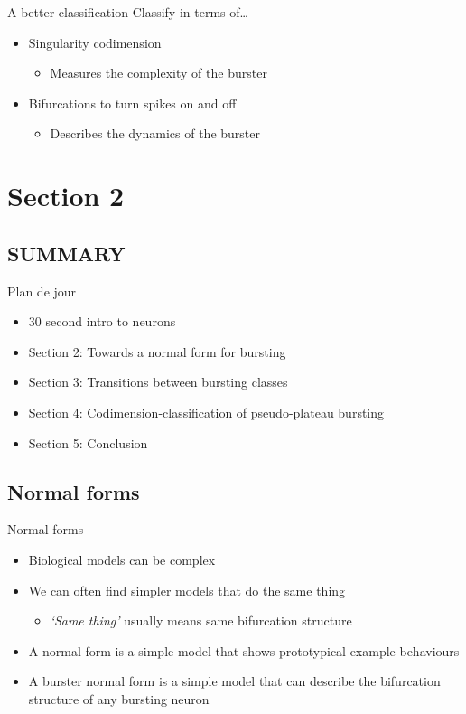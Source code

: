 \documentclass[presentation]{beamer}
\begin{document}
\begin{frame}[label={sec:org04835f9}]{A better classification}
Classify in terms of\ldots{}
\vfill
\begin{itemize}
\item Singularity codimension
\begin{itemize}
\item Measures the complexity of the burster
\end{itemize}
\item Bifurcations to turn spikes on and off
\begin{itemize}
\item Describes the dynamics of the burster
\end{itemize}
\end{itemize}
\end{frame}

\section{Section 2}
\label{sec:org0b0361a}
\subsection{SUMMARY}
\label{sec:org7ce973a}
\begin{frame}[label={sec:org483cdbd}]{Plan de jour}
\begin{itemize}
\item 30 second intro to neurons
\item \alert{Section 2: Towards a normal form for bursting}
\item Section 3: Transitions between bursting classes
\item Section 4: Codimension-classification of pseudo-plateau bursting
\item Section 5: Conclusion
\end{itemize}
\end{frame}

\subsection{Normal forms}
\label{sec:org163ac2e}
\begin{frame}[label={sec:orge0346d5}]{Normal forms}
\begin{itemize}[<+->]
\item Biological models can be complex
\item We can often find simpler models that do the same thing
\begin{itemize}
\item \emph{`Same thing'} usually means same bifurcation structure
\end{itemize}
\item A normal form is a simple model that shows prototypical example behaviours
\item A burster normal form is a simple model that can describe the bifurcation structure of any bursting neuron \vfill
\end{itemize}

\vfill
\end{frame}
\end{document}
